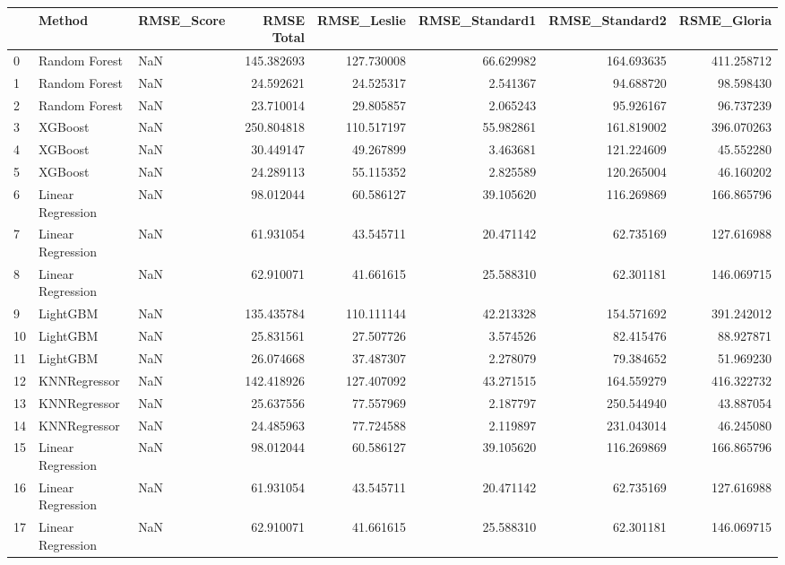 \begin{tabular}{lllrrrrr}
\toprule
{} &             Method & RMSE\_Score &  RMSE Total &  RMSE\_Leslie &  RMSE\_Standard1 &  RMSE\_Standard2 &  RSME\_Gloria \\
\midrule
0  &      Random Forest &        NaN &  145.382693 &   127.730008 &       66.629982 &      164.693635 &   411.258712 \\
1  &      Random Forest &        NaN &   24.592621 &    24.525317 &        2.541367 &       94.688720 &    98.598430 \\
2  &      Random Forest &        NaN &   23.710014 &    29.805857 &        2.065243 &       95.926167 &    96.737239 \\
3  &            XGBoost &        NaN &  250.804818 &   110.517197 &       55.982861 &      161.819002 &   396.070263 \\
4  &            XGBoost &        NaN &   30.449147 &    49.267899 &        3.463681 &      121.224609 &    45.552280 \\
5  &            XGBoost &        NaN &   24.289113 &    55.115352 &        2.825589 &      120.265004 &    46.160202 \\
6  &  Linear Regression &        NaN &   98.012044 &    60.586127 &       39.105620 &      116.269869 &   166.865796 \\
7  &  Linear Regression &        NaN &   61.931054 &    43.545711 &       20.471142 &       62.735169 &   127.616988 \\
8  &  Linear Regression &        NaN &   62.910071 &    41.661615 &       25.588310 &       62.301181 &   146.069715 \\
9  &           LightGBM &        NaN &  135.435784 &   110.111144 &       42.213328 &      154.571692 &   391.242012 \\
10 &           LightGBM &        NaN &   25.831561 &    27.507726 &        3.574526 &       82.415476 &    88.927871 \\
11 &           LightGBM &        NaN &   26.074668 &    37.487307 &        2.278079 &       79.384652 &    51.969230 \\
12 &       KNNRegressor &        NaN &  142.418926 &   127.407092 &       43.271515 &      164.559279 &   416.322732 \\
13 &       KNNRegressor &        NaN &   25.637556 &    77.557969 &        2.187797 &      250.544940 &    43.887054 \\
14 &       KNNRegressor &        NaN &   24.485963 &    77.724588 &        2.119897 &      231.043014 &    46.245080 \\
15 &  Linear Regression &        NaN &   98.012044 &    60.586127 &       39.105620 &      116.269869 &   166.865796 \\
16 &  Linear Regression &        NaN &   61.931054 &    43.545711 &       20.471142 &       62.735169 &   127.616988 \\
17 &  Linear Regression &        NaN &   62.910071 &    41.661615 &       25.588310 &       62.301181 &   146.069715 \\
\bottomrule
\end{tabular}
